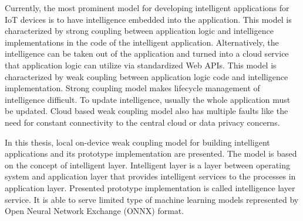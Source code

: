 \documentclass[english, 12pt, a4paper, elec, utf8, online]{aaltothesis}
\date{24.4.2018}
\begin{document}

\makecoverpage

\makecopyrightpage


\begin{abstractpage}[english]
Currently, the most prominent model for developing intelligent applications for IoT devices is to have intelligence embedded into the application. This model is characterized by strong coupling between application logic and intelligence implementations in the code of the intelligent application. Alternatively, the intelligence can be taken out of the application and turned into a cloud service that application logic can utilize via standardized Web APIs. This model is characterized by weak coupling between application logic code and intelligence implementation. Strong coupling model makes lifecycle management of intelligence difficult. To update intelligence, usually the whole application must be updated.  Cloud based weak coupling model also has multiple faults like the need for constant connectivity to the central cloud or data privacy concerns. 

In this thesis, local on-device weak coupling model for building intelligent applications and its prototype implementation are presented.  The model is based on the concept of intelligent layer. Intelligent layer is a layer between operating system and application layer that provides intelligent services to the processes in application layer. Presented prototype implementation is called intelligence layer service. It is able to serve limited type of machine learning models represented by Open Neural Network Exchange (ONNX) format.                
\end{abstractpage}
%  
%  
\end{document}
